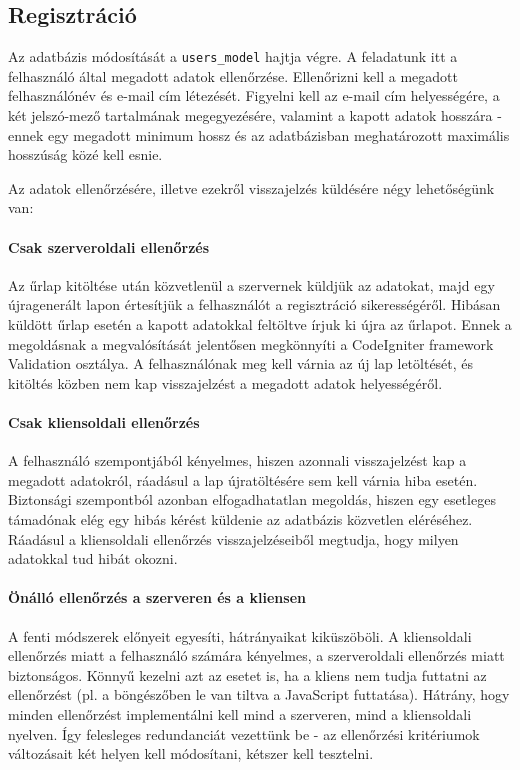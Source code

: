 \documentclass[12pt,a4paper,twoside]{article}
\begin{document}
\subsection{Regisztráció}
\label{sec:reg_check}

Az adatbázis módosítását a \texttt{users\_model} hajtja végre. A feladatunk itt
a felhasználó által megadott adatok ellenőrzése. Ellenőrizni
kell a megadott felhasználónév és e-mail cím létezését. Figyelni kell az e-mail
cím helyességére, a két jelszó-mező tartalmának megegyezésére, valamint a kapott
adatok hosszára - ennek egy megadott minimum hossz és az adatbázisban
meghatározott maximális hosszúság közé kell esnie.

Az adatok ellenőrzésére, illetve ezekről visszajelzés küldésére négy
lehetőségünk van:

\paragraph{Csak szerveroldali ellenőrzés}
Az űrlap kitöltése után közvetlenül a szervernek küldjük az adatokat, majd egy
újragenerált lapon értesítjük a felhasználót a regisztráció sikerességéről.
Hibásan küldött űrlap esetén a kapott adatokkal feltöltve írjuk ki újra az
űrlapot. Ennek a megoldásnak a megvalósítását jelentősen megkönnyíti a
CodeIgniter framework Validation osztálya\cite{CI-Val}. A felhasználónak meg
kell várnia az új lap letöltését, és kitöltés közben nem kap visszajelzést a
megadott adatok helyességéről.

\paragraph{Csak kliensoldali ellenőrzés}
A felhasználó szempontjából kényelmes, hiszen azonnali visszajelzést kap a
megadott adatokról, ráadásul a lap újratöltésére sem kell várnia hiba
esetén. Biztonsági szempontból azonban elfogadhatatlan megoldás, hiszen egy
esetleges támadónak elég egy hibás kérést küldenie az adatbázis közvetlen
eléréséhez. Ráadásul a kliensoldali ellenőrzés visszajelzéseiből megtudja, hogy
milyen adatokkal tud hibát okozni.

\paragraph{Önálló ellenőrzés a szerveren és a kliensen}
A fenti módszerek előnyeit egyesíti, hátrányaikat kiküszöböli. A kliensoldali
ellenőrzés miatt a felhasználó számára kényelmes, a szerveroldali ellenőrzés
miatt biztonságos. Könnyű kezelni azt az esetet is, ha a kliens nem tudja
futtatni az ellenőrzést (pl. a böngészőben le van tiltva a JavaScript
futtatása). Hátrány, hogy minden ellenőrzést implementálni kell mind
a szerveren, mind a kliensoldali nyelven. Így felesleges redundanciát vezettünk
be - az ellenőrzési kritériumok változásait két helyen kell módosítani, kétszer
kell tesztelni.
\end{document}
